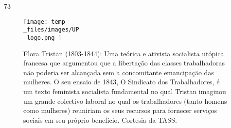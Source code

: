  \par 
73
 \par 
\begin{figure}
	\centering
	\texttt{[image: temp\\\_files/images/UP\\\_logo.png ]}
	\caption{Flora Tristan (1803-1844): Uma teórica e ativista socialista utópica francesa que argumentou que a libertação das classes trabalhadoras não poderia ser alcançada sem a concomitante emancipação das mulheres. O seu ensaio de 1843, O Sindicato dos Trabalhadores, é um texto feminista socialista fundamental no qual Tristan imaginou um grande colectivo laboral no qual os trabalhadores (tanto homens como mulheres) reuniriam os seus recursos para fornecer serviços sociais em seu próprio benefício. Cortesia da TASS.}
	\label{ }
\end{figure}